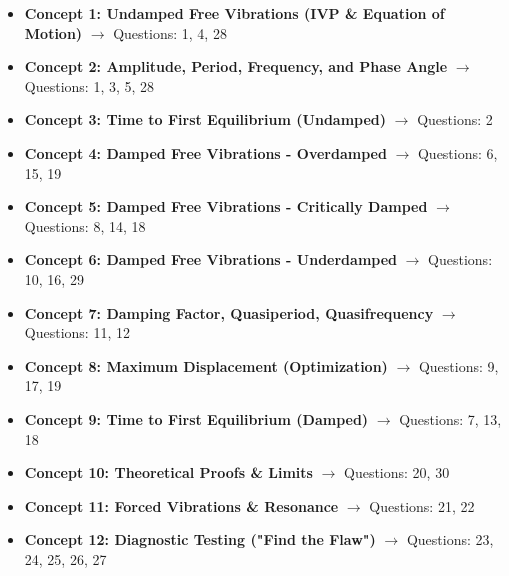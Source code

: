 \documentclass[11pt]{article}
\begin{document}
\begin{itemize}
    \item \textbf{Concept 1: Undamped Free Vibrations (IVP \& Equation of Motion)} $\rightarrow$ Questions: 1, 4, 28
    \item \textbf{Concept 2: Amplitude, Period, Frequency, and Phase Angle} $\rightarrow$ Questions: 1, 3, 5, 28
    \item \textbf{Concept 3: Time to First Equilibrium (Undamped)} $\rightarrow$ Questions: 2
    \item \textbf{Concept 4: Damped Free Vibrations - Overdamped} $\rightarrow$ Questions: 6, 15, 19
    \item \textbf{Concept 5: Damped Free Vibrations - Critically Damped} $\rightarrow$ Questions: 8, 14, 18
    \item \textbf{Concept 6: Damped Free Vibrations - Underdamped} $\rightarrow$ Questions: 10, 16, 29
    \item \textbf{Concept 7: Damping Factor, Quasiperiod, Quasifrequency} $\rightarrow$ Questions: 11, 12
    \item \textbf{Concept 8: Maximum Displacement (Optimization)} $\rightarrow$ Questions: 9, 17, 19
    \item \textbf{Concept 9: Time to First Equilibrium (Damped)} $\rightarrow$ Questions: 7, 13, 18
    \item \textbf{Concept 10: Theoretical Proofs \& Limits} $\rightarrow$ Questions: 20, 30
    \item \textbf{Concept 11: Forced Vibrations \& Resonance} $\rightarrow$ Questions: 21, 22
    \item \textbf{Concept 12: Diagnostic Testing ("Find the Flaw")} $\rightarrow$ Questions: 23, 24, 25, 26, 27
\end{itemize}
\end{document}
